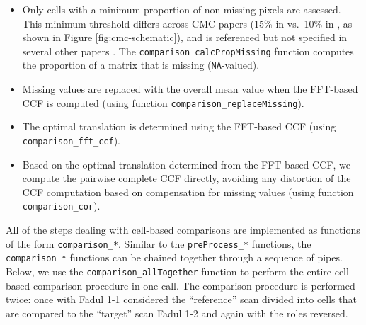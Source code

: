 \documentclass[11pt,]{isuthesis}
\begin{document}
\begin{itemize}
\item
  Only cells with a minimum proportion of non-missing pixels are assessed. This minimum threshold differs across CMC papers (15\% in \citet{chen_convergence_2017} vs.~10\% in \citet{song_estimating_2018}, as shown in Figure \ref{fig:cmc-schematic}), and is referenced but not specified in several other papers \citep{tong_fired_2014, song_3d_2014, chu_validation_2013}. The \texttt{comparison\_calcPropMissing} function computes the proportion of a matrix that is missing (\texttt{NA}-valued).
\item
  Missing values are replaced with the overall mean value when the FFT-based CCF is computed (using function \texttt{comparison\_replaceMissing}).
\item
  The optimal translation is determined using the FFT-based CCF (using \texttt{comparison\_fft\_ccf}).
\item
  Based on the optimal translation determined from the FFT-based CCF, we compute the pairwise complete CCF directly, avoiding any distortion of the CCF computation based on compensation for missing values (using function \texttt{comparison\_cor}).
\end{itemize}

All of the steps dealing with cell-based comparisons are implemented as functions of the form \texttt{comparison\_*}.
Similar to the \texttt{preProcess\_*} functions, the \texttt{comparison\_*} functions can be chained together through a sequence of pipes.
Below, we use the \texttt{comparison\_allTogether} function to perform the entire cell-based comparison procedure in one call.
The comparison procedure is performed twice: once with Fadul 1-1 considered the ``reference'' scan divided into cells that are compared to the ``target'' scan Fadul 1-2 and again with the roles reversed.
\end{document}
